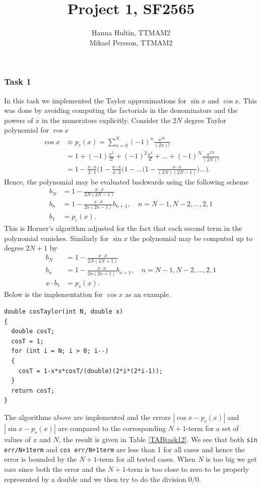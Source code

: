 \documentclass[a4paper,10pt]{article}
\title{Project 1, SF2565}
\author{Hanna Hultin, TTMAM2 \\ Mikael Persson, TTMAM2}
\begin{document}
\maketitle

\subsubsection*{Task 1}
In this task we implemented the Taylor approximations for $\sin x$ and $\cos x$.
This was done by avoiding computing the factorials in the denominators and the powers of $x$ in the numerators explicitly.
Consider the $2N$ degree Taylor polynomial for  $\cos x$
\begin{align*}
  \cos x &\approx p_c(x) = \sum_{n=0}^{N} (-1)^n \frac{x^{2n}}{(2n)!} \\ 
  \quad &= 1 + (-1) \frac{x^2}{2!} + (-1)^2 \frac{x^4}{4!} + \dots + (-1)^N \frac{x^{2N}}{(2N)!}
  \\
  &= 1 - \frac{x\cdot x}{2\cdot 1} \Big(1 - \frac{x \cdot x}{ 4 \cdot 3} \Big( 
  1 - \dots \Big(1- \frac{x \cdot x}{(2N)(2N-1)}\Big)\dots \Big).
\end{align*}
Hence, the polynomial may be evaluated backwards using the following scheme
\begin{align*}
  b_N &= 1-\frac{x \cdot x}{2N(2N-1)} \\
  b_n &= 1-\frac{x\cdot x}{2n(2n-1)}b_{n+1},\quad n = N-1,N-2,\dots,2,1 \\
  b_1 &= p_c(x).
\end{align*}
This is Horner's algorithm adjusted for the fact that each second term in the polynomial vanishes.
Similarly for $\sin x$ the polynomial may be computed up to degree $2N+1$ by
\begin{align*}
  b_N &= 1-\frac{x \cdot x}{2N(2N+1)} \\
  b_n &= 1-\frac{x\cdot x}{2n(2n+1)}b_{n+1},\quad n = N-1,N-2,\dots,2,1 \\
  x\cdot b_1 &= p_s(x).
\end{align*}
Below is the implementation for $\cos x$ as an example.
\begin{center}
\begin{minipage}[t]{85mm}
\begin{lstlisting}
double cosTaylor(int N, double x) 
{
  double cosT;
  cosT = 1;
  for (int i = N; i > 0; i--)
  {
    cosT = 1-x*x*cosT/(double)(2*i*(2*i-1));
  }
  return cosT;
}
\end{lstlisting}
\end{minipage}
\end{center}
The algorithms above are implemented and the errors 
$|\cos x - p_c(x)|$ and $|\sin x - p_s (x)|$ are 
compared to the corresponding $N+1$-term for a set of values of $x$ and $N$, the result is given
in Table \ref{TABtask12}. We see that both \texttt{sin err/N+1term} and \texttt{cos err/N+1term} are less than 1 for all cases and hence the error is bounded by the $N+1$-term for all tested cases. When $N$ is too big we get $nan$ since both the error and the $N+1$-term is too close to zero to be properly represented by a double and we then try to do the division $0/0$.
\end{document}
